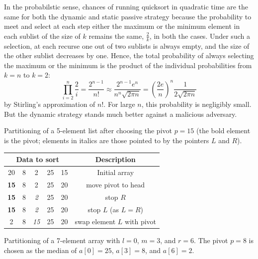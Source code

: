 In the probabilstic sense, chances of running quicksort in quadratic time
are the same for both the dynamic and static passive strategy because the 
probability to meet and select at each step either the maximum or the minimum 
element in each sublist of the size of $k$ remains the same, \(\frac{2}{k}\), in both 
the cases. Under such a selection, at each recurse one out of two sublists is 
always empty, and 
the size of the other sublist decreases by one. Hence, 
the total probability of always selecting the maximum or the minimum is 
the product of the individual probabilities from \(k=n\) to \(k=2\):
\[
\prod\limits_{i=2}^n\frac{2}{i} = \frac{2^{n-1}}{n!} \approx \frac {2^{n-1}e^{n}}{n^{n}\sqrt{2\pi n}}
= \left(\frac{2e}{n}\right)^n \frac{1}{2\sqrt{2\pi n}}
\]
by Stirling's approximation of $n!$. For large $n$, this probability is negligibly small.
But the dynamic strategy stands much better against a malicious adversary.
\fi

{}%
Partitioning of a 5-element list after choosing the pivot $p=15$ 
(the bold element is the pivot; elements in italics are those pointed 
to by the pointers $L$ and $R$).

\begin{center}
\begin{tabular}{|c|c|c|c|c|c|}
\hline
\multicolumn{5}{|c|}{\textbf{Data to sort}}& {\textbf{Description}}\\ \hline
20& 8& 2& 25& 15&  Initial array \\ \hline
\textbf{15}& 8& 2& 25& 20& move pivot to head\\ \hline
\textbf{15}& 8& \textit{\large 2}& 25& 20& stop $R$\\ \hline
\textbf{15}& 8& \textit{\large 2}& 25& 20& stop $L$ (as $L=R$)\\ \hline
2 & 8& \textit{15}& 25& 20& swap element $L$ with pivot\\ \hline
\end{tabular}
\end{center}


Partitioning of a 7-element array with \(l=0\), \(m=3\), and \(r=6\). The pivot
\(p=8\) is chosen as the median of \(a[0]=25\), \(a[3]=8\), and \(a[6]=2\).

